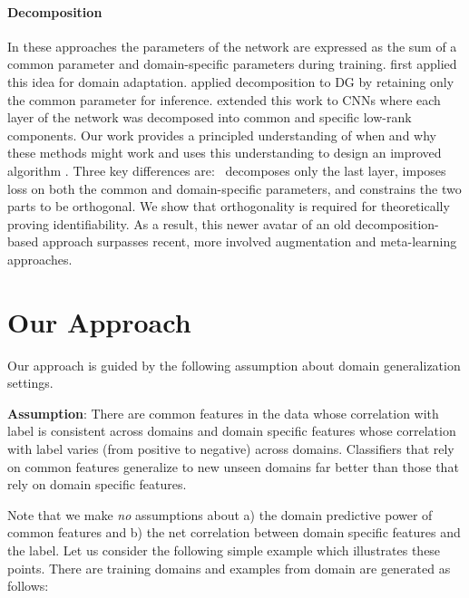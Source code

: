 \documentclass{article}
\begin{document}
\paragraph{Decomposition} In these approaches the parameters of the network are expressed as the sum of a common parameter and  domain-specific parameters during training.  \citet{Daume2007} first applied this idea for domain adaptation.  \citet{ECCV12_Khosla} applied decomposition to DG by retaining only the common parameter for inference. \citet{LiYSH17} extended this work to CNNs where each layer of the network was decomposed into common and specific low-rank components.  
Our work provides a principled understanding of when and why these methods might work and uses this understanding to design an improved algorithm \mos.  Three key differences are:  \mos\ decomposes only the last layer, imposes loss on both the common and domain-specific parameters, and constrains the two parts to be orthogonal.  We show that orthogonality is required for theoretically proving identifiability. As a result, this newer avatar of an old decomposition-based approach surpasses recent, more involved augmentation and meta-learning approaches. 








    
\section{Our Approach}
Our approach is guided by the following assumption about domain generalization settings.

\textbf{Assumption}: There are common features in the data whose correlation with label is consistent across domains and domain specific features whose correlation with label varies (from positive to negative) across domains. Classifiers that rely on common features generalize to new unseen domains far better than those that rely on domain specific features.

Note that we make \emph{no} assumptions about a) the domain predictive power of common features and b) the net correlation between domain specific features and the label. Let us consider the following simple example which illustrates these points. There are  training domains and examples  from domain  are generated as follows:
\end{document}
